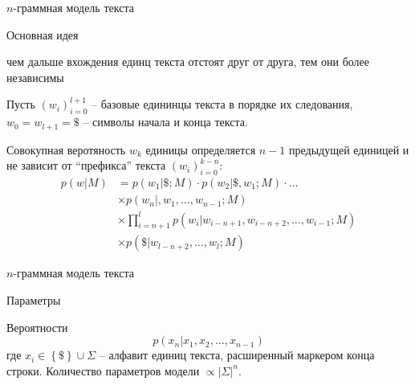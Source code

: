 \documentclass{beamer}
\newcommand{\obj}[1]{\left\{ #1 \right \}}
\newcommand{\brac}[1]{\left ( #1 \right )}
\newcommand{\induc}[1]{\left . #1 \right \vert}
\newcommand{\abs}[1]{\left | #1 \right |}
\begin{document}
\begin{frame}{$n$-граммная модель текста}
  \begin{block}{Основная идея}

     чем дальше вхождения единц текста отстоят друг от друга, тем они более независимы
  \end{block}

  \begin{block}

    Пусть $\brac{w_i}_{i=0}^{l+1}$ -- базовые едининцы текста в порядке их следования, $w_0=w_{l+1}=\$$ -- символы начала и конца текста.

    Совокупная веротяность $w_k$ единицы определяется $n-1$ предыдущей единицей и не зависит от ``префикса'' текста $\brac{w_i}_{i=0}^{k-n}$:
    \begin{align*}
      p\brac{\induc{w}M} &= p\brac{\induc{w_1}\$;M} \cdot p\brac{\induc{w_2}\$,w_1;M} \cdot \ldots \\
        &\times p\brac{\induc{w_n},w_1,\ldots,w_{n-1};M} \\
        &\times \prod_{i=n+1}^l p\brac{\induc{w_i}w_{i-n+1}, w_{i-n+2}, \ldots, w_{i-1};M} \\ 
        &\times p\brac{\induc{\$}w_{l-n+2}, \ldots, w_l;M}
    \end{align*}
  \end{block}
\end{frame}

\begin{frame}{$n$-граммная модель текста}
  \begin{block}{Параметры}

    Вероятности
    \[p\brac{\induc{x_n}x_1, x_2, \ldots, x_{n-1}}\] 
    где $x_i\in \obj{\$}\cup \Sigma$ -- алфавит единиц текста, расширенный маркером конца строки.
    Количество параметров модели $\propto \abs{\Sigma}^n$.
  \end{block}
\end{frame}

\end{document}
